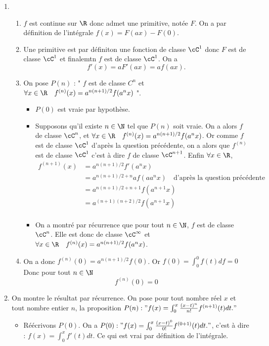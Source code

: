 \documentclass[a4paper, 11pt,reqno]{article}
\begin{document}
\begin{correction}
\begin{enumerate}
\item 
\begin{enumerate}
\item $f$ est continue sur $\R$ donc admet une primitive, notée $F$. On a 
par définition de l'intégrale $f(x) = F(ax) - F(0)$. 
\item Une primitive est par définiton une fonction de classe $\cC^1$ donc $F$ est de classe $\cC^1$ et finalemtn $f$ est de classe $\cC^1$. On a 
$$f'(x) = a F'(ax) = af(ax).$$ 
\item On pose $P(n)$ : " $f$ est de classe $C^n$ et $\forall x\in \R \quad  f^{(n)} (x) =a^{n(n+1)/2} f(a^nx)$ ".
\begin{itemize}
\item $P(0)$ est vraie par hypothèse. 
\item Supposons qu'il existe $n\in \N$ tel que $P(n)$ soit vraie. On a alors $f$ de classe $\cC^n$, et $\forall x\in \R \quad  f^{(n)} (x) =a^{n(n+1)/2} f(a^nx)$. 
Or comme $f$ est de classe $\cC^1$ d'après la question précédente, on a alors que $ f^{(n)}$ est de classe $\cC^1$ c'est à dire $f$ de classe $\cC^{n+1}$. Enfin 
$\forall x\in \R$,   \begin{align*}
 f^{(n+1)} (x) &= a^{n(n+1)/2}  f'(a^nx)\\ 
 						&= a^{n(n+1)/2+n} a f(a a^n x) \quad \text{d'après la question précédente}\\
 						&= a^{n(n+1)/2+n+1} f(a^{n+1} x) \\
 						&= a^{(n+1)(n+2)/2} f(a^{n+1} x) \\
\end{align*} 
\item On a montré par récurrence que pour tout $n\in \N$, $f$ est de classe $\cC^n$. Elle est donc de classe $\cC^\infty$ et $\forall x\in \R \quad  f^{(n)} (x) =a^{n(n+1)/2} f(a^nx)$.
\end{itemize}
\item  On a donc $f^{(n)} (0) = a^{n(n+1)/2 } f(0) $. Or $f(0) = \int_0^{0} f(t)df =0$
Donc pour tout $n\in \N$ $$f^{(n)} (0) =0$$
\end{enumerate}
\item On montre le résultat par récurrence. On pose pour tout nombre réel $x$ et tout nombre entier $n$, la proposition 
$P(n) : "f(x) = \int_0^x \frac{(x-t)^n}{n!} f^{(n+1)} (t) dt."$
\begin{itemize}
\item Réécrivons $P(0)$. On a $P(0) : "f(x) = \int_0^x \frac{(x-t)^0}{0!} f^{(0+1)} (t) dt. " $, c'est à dire : $f(x) = \int_0^x  f'(t) dt.$ Ce qui est vrai par définition de l'intégrale. 

\end{itemize}
\end{enumerate}
\end{correction}
\end{document}

